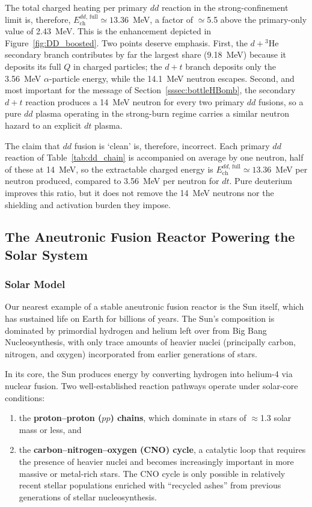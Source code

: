 \documentclass[particles,article,accept,pdftex,moreauthors]{Definitions/mdpi}
\newcommand{\rsec}[1]{Section~\ref{#1}}
\begin{document}
The total charged heating per primary $dd$ reaction in the strong-confinement limit is, therefore, $E_\mathrm{ch}^{dd,\,\mathrm{full}}\simeq 13.36$~MeV, a factor of $\simeq$5.5 above the primary-only value of 2.43~MeV. This is the enhancement depicted in Figure~\ref{fig:DD_boosted}. Two points deserve emphasis. First, the $d+{}^3\mathrm{He}$ secondary branch contributes by far the largest share (9.18~MeV) because it deposits its full $Q$ in charged particles; the $d+t$ branch deposits only the 3.56~MeV $\alpha$-particle energy, while the 14.1~MeV neutron escapes. Second, and most important for the message of \rsec{sssec:bottleHBomb}, the secondary $d+t$ reaction produces a 14~MeV neutron for every two primary $dd$ fusions, so a pure $dd$ plasma operating in the strong-burn regime carries a similar neutron hazard to an explicit $dt$ plasma.

The claim that $dd$ fusion is `clean' is, therefore, incorrect. Each primary $dd$ reaction of Table~\ref{tab:dd_chain} is accompanied on average by one neutron, half of these at 14~MeV, so the extractable charged energy is $E_\mathrm{ch}^{dd,\,\mathrm{full}}\simeq13.36$~MeV per neutron produced, compared to 3.56~MeV per neutron for $dt$. Pure deuterium improves this ratio, but it does not remove the 14~MeV neutrons nor the shielding and activation burden they impose.

\subsection{The Aneutronic Fusion Reactor Powering the Solar System}\label{ssec:SolarFusion}
\subsubsection{Solar Model}\label{sssec:Solar}
Our nearest example of a stable aneutronic fusion reactor is the Sun itself, which has sustained life on Earth for billions of years. The Sun's composition is dominated by primordial hydrogen and helium left over from Big Bang Nucleosynthesis, with only trace amounts of heavier nuclei (principally carbon, nitrogen, and oxygen) incorporated from earlier generations of stars.

In its core, the Sun produces energy by converting hydrogen into helium-4 via nuclear fusion. Two well-established reaction pathways operate under solar-core conditions:
\begin{enumerate}[label=(\arabic*),nosep]
\item the \textbf{proton--proton ($pp$) chains}, which dominate in stars of $\approx$1.3 solar mass or less, and
\item the \textbf{carbon--nitrogen--oxygen (CNO) cycle}, a catalytic loop that requires the presence of heavier nuclei and becomes increasingly important in more massive or metal-rich stars. The CNO cycle is only possible in relatively recent stellar populations enriched with ``recycled ashes'' from previous generations of stellar nucleosynthesis.
\end{enumerate}
\end{document}
